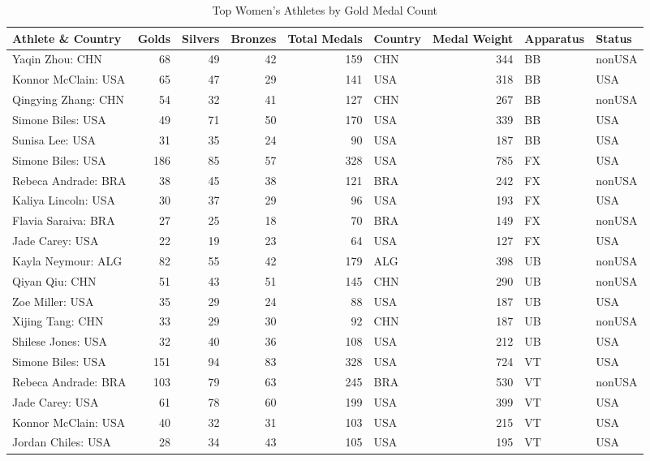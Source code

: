 \documentclass[
  10.5pt,
  letterpaper,
  DIV=11,
  numbers=noendperiod]{scrartcl}
\begin{document}
\begin{table}[H]

\caption{Top Women's Athletes by Gold Medal Count}
\centering
\fontsize{8}{10}\selectfont
\begin{tabular}[t]{l|r|r|r|r|l|r|l|l}
\hline
Athlete \& Country & Golds & Silvers & Bronzes & Total Medals & Country & Medal Weight & Apparatus & Status\\
\hline
Yaqin Zhou: CHN & 68 & 49 & 42 & 159 & CHN & 344 & BB & nonUSA\\
\hline
Konnor McClain: USA & 65 & 47 & 29 & 141 & USA & 318 & BB & USA\\
\hline
Qingying Zhang: CHN & 54 & 32 & 41 & 127 & CHN & 267 & BB & nonUSA\\
\hline
Simone Biles: USA & 49 & 71 & 50 & 170 & USA & 339 & BB & USA\\
\hline
Sunisa Lee: USA & 31 & 35 & 24 & 90 & USA & 187 & BB & USA\\
\hline
Simone Biles: USA & 186 & 85 & 57 & 328 & USA & 785 & FX & USA\\
\hline
Rebeca Andrade: BRA & 38 & 45 & 38 & 121 & BRA & 242 & FX & nonUSA\\
\hline
Kaliya Lincoln: USA & 30 & 37 & 29 & 96 & USA & 193 & FX & USA\\
\hline
Flavia Saraiva: BRA & 27 & 25 & 18 & 70 & BRA & 149 & FX & nonUSA\\
\hline
Jade Carey: USA & 22 & 19 & 23 & 64 & USA & 127 & FX & USA\\
\hline
Kayla Neymour: ALG & 82 & 55 & 42 & 179 & ALG & 398 & UB & nonUSA\\
\hline
Qiyan Qiu: CHN & 51 & 43 & 51 & 145 & CHN & 290 & UB & nonUSA\\
\hline
Zoe Miller: USA & 35 & 29 & 24 & 88 & USA & 187 & UB & USA\\
\hline
Xijing Tang: CHN & 33 & 29 & 30 & 92 & CHN & 187 & UB & nonUSA\\
\hline
Shilese Jones: USA & 32 & 40 & 36 & 108 & USA & 212 & UB & USA\\
\hline
Simone Biles: USA & 151 & 94 & 83 & 328 & USA & 724 & VT & USA\\
\hline
Rebeca Andrade: BRA & 103 & 79 & 63 & 245 & BRA & 530 & VT & nonUSA\\
\hline
Jade Carey: USA & 61 & 78 & 60 & 199 & USA & 399 & VT & USA\\
\hline
Konnor McClain: USA & 40 & 32 & 31 & 103 & USA & 215 & VT & USA\\
\hline
Jordan Chiles: USA & 28 & 34 & 43 & 105 & USA & 195 & VT & USA\\
\hline
\end{tabular}
\end{table}
\end{document}
